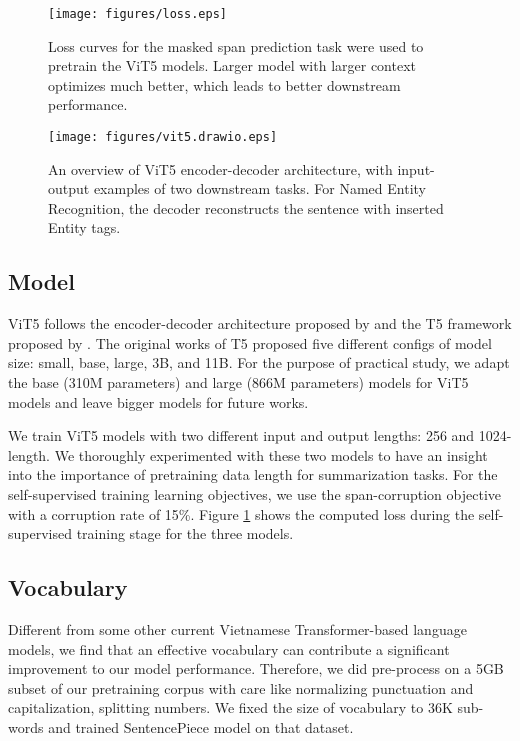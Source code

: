 \documentclass[11pt,a4paper]{article}
\begin{document}
\begin{figure}[H]
    \centering
    \texttt{[image: figures/loss.eps]}
    \caption{Loss curves for the masked span prediction task were used to pretrain the ViT5 models. Larger model with larger context optimizes much better, which leads to better downstream performance.}
    \label{fig:loss}
\end{figure}


\begin{figure*}[hbt!]
    \centering
    \texttt{[image: figures/vit5.drawio.eps]}
    \caption{An overview of ViT5 encoder-decoder architecture, with input-output examples of two downstream tasks. For Named Entity Recognition, the decoder reconstructs the sentence with inserted Entity tags.}
    \label{fig:vit5}
\end{figure*}





\subsection{Model}
ViT5 follows the encoder-decoder architecture proposed by \citet{attention} and the T5 framework proposed by \cite{t5}. The original works of T5 proposed five different configs of model size: small, base, large, 3B, and 11B. For the purpose of practical study, we adapt the base (310M parameters) and large (866M parameters) models for ViT5 models and leave bigger models for future works. 

We train ViT5 models with two different input and output lengths: 256 and 1024-length. We thoroughly experimented with these two models to have an insight into the importance of pretraining data length for summarization tasks. For the self-supervised training learning objectives, we use the span-corruption objective with a corruption rate of 15\%. Figure \ref{fig:loss} shows the computed loss during the self-supervised training stage for the three models.

\subsection{Vocabulary}
Different from some other current Vietnamese Transformer-based language models, we find that an effective vocabulary can contribute a significant improvement to our model performance. Therefore, we did pre-process on a 5GB subset of our pretraining corpus with care like normalizing punctuation and capitalization, splitting numbers. We fixed the size of vocabulary to 36K sub-words and trained SentencePiece \cite{Kudo2018SentencePieceAS} model on that dataset.
\end{document}
